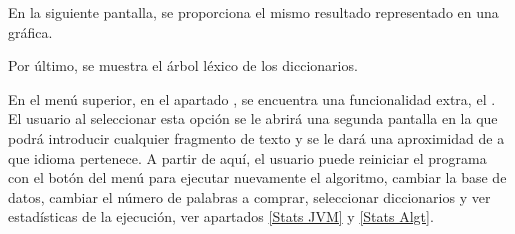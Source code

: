 En la siguiente pantalla, se proporciona el mismo resultado representado en una gráfica. \bigskip

Por último, se muestra el árbol léxico de los diccionarios.\bigskip

En el menú superior, en el apartado , se encuentra una funcionalidad extra, el . El usuario al seleccionar esta opción se le abrirá una segunda pantalla en la que podrá introducir cualquier fragmento de texto y se le dará una aproximidad de a que idioma pertenece.
A partir de aquí, el usuario puede reiniciar el programa con el botón del menú para ejecutar nuevamente el algoritmo, cambiar la base de datos, cambiar el número de palabras a comprar, seleccionar diccionarios y ver estadísticas de la ejecución, ver apartados \ref{Stats JVM} y \ref{Stats Algt}.
